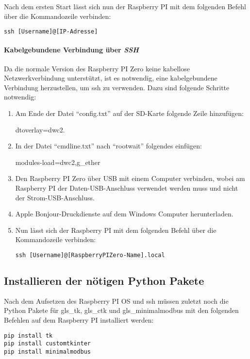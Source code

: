 Nach dem ersten Start lässt sich nun der Raspberry PI mit dem folgenden Befehl über die Kommandozeile verbinden:
\begin{verbatim}
ssh [Username]@[IP-Adresse]
\end{verbatim}

\paragraph{Kabelgebundene Verbindung über \textit{SSH}}
Da die normale Version des Raspberry PI Zero keine kabellose Netzwerkverbindung unterstützt, ist es notwendig, eine kabelgebundene Verbindung herzustellen, um \ac{ssh} zu verwenden. Dazu sind folgende Schritte notwendig:

\begin{enumerate}
    \item Am Ende der Datei \enquote{config.txt} auf der SD-Karte folgende Zeile hinzufügen: \begin{textcode}
    dtoverlay=dwc2.
    \end{textcode}
    \item In der Datei \enquote{cmdline.txt} nach \enquote{rootwait} folgendes einfügen:
    \begin{textcode}
    modules-load=dwc2,g_ether
    \end{textcode}
    \item Den Raspberry PI Zero über USB mit einem Computer verbinden, wobei am Raspberry PI der Daten-USB-Anschluss verwendet werden muss und nicht der Strom-USB-Anschluss.
    \item Apple Bonjour-Druckdienste auf dem Windows Computer herunterladen.
    \item Nun lässt sich der Raspberry PI mit dem folgenden Befehl über die Kommandozeile verbinden:
    \begin{verbatim}
ssh [Username]@[RaspberryPIZero-Name].local
    \end{verbatim}
\end{enumerate}

\subsection{Installieren der nötigen Python Pakete}
Nach dem Aufsetzen des Raspberry PI OS und \ac{ssh} müssen zuletzt noch die Python Pakete für \gls{gls_tk}, \gls{gls_ctk} und \gls{gls_minimalmodbus} mit den folgenden Befehlen auf dem Raspberry PI installiert werden:

\begin{verbatim}
pip install tk
pip install customtkinter
pip install minimalmodbus
\end{verbatim}

